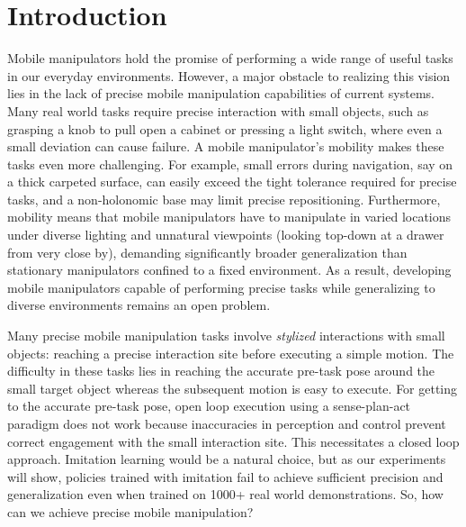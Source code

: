 
\section{Introduction}


Mobile manipulators hold the promise of performing a wide range of useful tasks in
our 
everyday environments.
However, a major obstacle to realizing this vision lies in the lack of precise mobile manipulation capabilities of current systems.
Many real world
tasks require precise interaction with small objects, such as grasping a knob to pull open a cabinet or pressing a light switch, 
where even a small deviation can cause failure.
A mobile manipulator's mobility makes these tasks even more challenging.
For example, small errors during navigation, say on a 
thick
carpeted surface, can easily exceed the tight tolerance required for precise tasks, and a non-holonomic base may limit precise repositioning.
Furthermore, mobility means that mobile manipulators have to manipulate in varied locations under diverse lighting and unnatural viewpoints 
(\eg looking top-down at a drawer from very close by), demanding significantly broader generalization than stationary manipulators confined to 
a fixed environment.
As a result, developing mobile manipulators 
capable of performing 
precise tasks while generalizing to diverse environments remains an open problem.











Many precise mobile manipulation tasks involve {\it stylized} interactions with small objects: reaching a precise interaction site before executing a simple motion. 
The difficulty in these tasks lies in reaching the accurate pre-task pose around the small target object 
whereas the subsequent motion is easy to execute.
For getting to the accurate pre-task pose, open loop execution using a sense-plan-act
paradigm does not work because inaccuracies in perception and control prevent
correct engagement with the small interaction site. 
This necessitates a closed loop approach. Imitation learning would be a natural choice, but as our experiments will show, policies trained with imitation fail to achieve sufficient precision and generalization even when trained on 1000+ real world demonstrations.
So, how can we achieve precise mobile manipulation?






